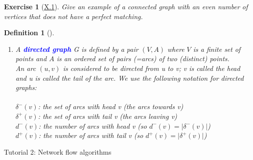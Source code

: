 \documentclass[10pt]{report}
\makeatletter
\numberwithin{dummy}{section}
\theoremstyle{ocrenumbox}
\newtheorem{definitionT}{Exercise}[]
\theoremstyle{grayman}
\newtheorem{definitionTTTT}{Definition}[]
\newenvironment{exo}{\begin{dBox}\begin{definitionT}}{\end{definitionT}\end{dBox}}
\newenvironment{voc}{\begin{vBox}\begin{definitionTTTT}}{\end{definitionTTTT}\end{vBox}}
\renewcommand{\section}{\@startsection{section}{1}{\z@}
{-4ex \@plus -1ex \@minus -.4ex}
{1ex \@plus.2ex }
{\normalfont\large\sffamily\bfseries}}
\makeatother
\begin{document}
\begin{exo}[\hypertarget{exox1}{\hyperlink{solx1}{X.1}}] 
Give an example of a connected graph with an even number
of vertices that does not have a perfect matching.
\end{exo}
\begin{voc}[]\leavevmode
\begin{enumerate}
    \item A \textbf{\textcolor{blue}{directed graph}} G is defined by a pair $(V, A)$ where $V$ is a finite set of
points and $A$ is an ordered set of pairs (=arcs) of two (distinct) points.\\
An arc $(u, v)$ is considered to be directed from u to v; v is called the head and u is called the tail of the arc. We use the following notation for directed graphs:\\ \\
$\delta^{-}(v)$: the set of arcs with head v (the arcs towards v)\\
$\delta^{+}(v)$: the set of arcs with tail v (the arcs leaving v)\\
$d^{-}(v)$: the number of arcs with head v (so $d^{-}(v) = \lvert \delta^{-}(v) \rvert$)\\
$d^{+}(v)$: the number of arcs with tail v (so $d^{+}(v) = \lvert \delta^{+}(v) \rvert$)

\begin{center}
\end{center}


\end{enumerate}
\end{voc}
\section{Tutorial 2: Network flow algorithms}
\end{document}
